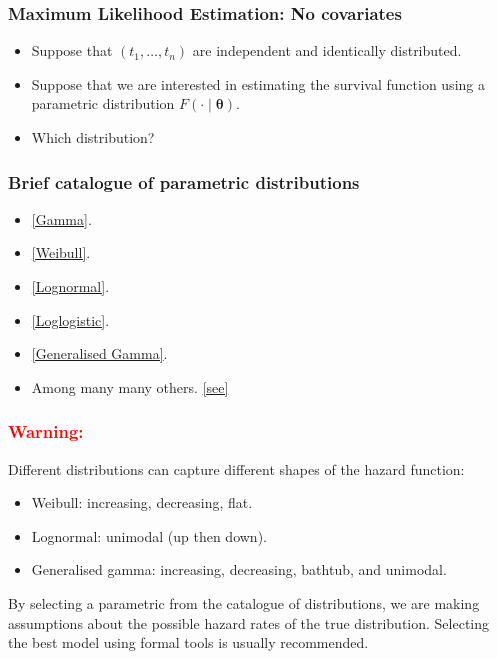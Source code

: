\documentclass[10pt,handout,compress]{beamer}
\newcommand{\btheta}{\bm{\theta}}
\begin{document}
\begin{frame}
\frametitle{Maximum Likelihood Estimation: No covariates}
\begin{itemize}
\item Suppose that $(t_1,\ldots,t_n)$ are independent and identically distributed.
\pause
\item Suppose that we are interested in estimating the survival function using a parametric distribution $F(\cdot \mid \btheta)$.
\pause
\item Which distribution?
\end{itemize}
\end{frame}



\begin{frame}
\frametitle{Brief catalogue of parametric distributions}
\begin{itemize}
\item \href{https://en.wikipedia.org/wiki/Gamma_distribution}{[Gamma]}.
\item \href{https://en.wikipedia.org/wiki/Weibull_distribution}{[Weibull]}.
\item \href{https://en.wikipedia.org/wiki/Log-normal_distribution}{[Lognormal]}.
\item \href{https://en.wikipedia.org/wiki/Log-logistic_distribution}{[Loglogistic]}.
\item \href{https://en.wikipedia.org/wiki/Generalized_gamma_distribution}{[Generalised Gamma]}.
\item Among many many others. \href{https://rpubs.com/FJRubio/PGW}{[see]}
\end{itemize}
\end{frame}

\begin{frame}
\frametitle{\textcolor{red}{Warning:}}
Different distributions can capture different shapes of the hazard function: \pause
\vspace{0.5cm}
\begin{itemize}
\item Weibull: increasing, decreasing, flat. \pause
\item Lognormal: unimodal (up then down). \pause
\item Generalised gamma:  increasing, decreasing, bathtub, and unimodal. \pause
\end{itemize}
\vspace{0.5cm}
By selecting a parametric from the catalogue of distributions, we are making assumptions about the possible hazard rates of the true distribution. Selecting the best model using formal tools is usually recommended.
\end{frame}
\end{document}
